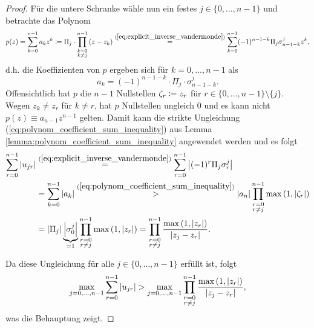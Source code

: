 \begin{proof}
    \noindent Für die untere Schranke wähle nun ein festes
    $j \in \{0, \dots, n-1\}$ und betrachte das Polynom
    \[
        p(z) = \sum_{k=0}^{n-1} a_k z^k
        \coloneqq \Pi_j \cdot \prod_{\substack{k=0\\ k \neq j}}^{n-1} \left( z - z_k \right)
        \overset{(\ref{eq:explicit_inverse_vandermonde})}{=} \sum_{k=0}^{n-1} (-1)^{n-1-k} \Pi_j \sigma_{n-1-k}^j z^k,
    \]
    d.h. die Koeffizienten von $p$ ergeben sich für $k = 0, \dots, n-1$ als
    \[
        a_k = (-1)^{n-1-k} \cdot \Pi_j \cdot \sigma_{n-1-k}^j.
    \]
    Offensichtlich hat $p$ die $n-1$ Nullstellen
    $\zeta_r \coloneqq z_r$ für $r \in \{0,\dots,n-1\} \setminus \{j\}$.
    Wegen $z_k \neq z_r$ für $k \neq r$, hat $p$ Nullstellen ungleich $0$ und
    es kann nicht $p(z) \equiv a_{n-1} z^{n-1}$ gelten.
    Damit kann die strikte Ungleichung
    (\ref{eq:polynom_coefficient_sum_inequality}) aus Lemma
    \ref{lemma:polynom_coefficient_sum_inequality} angewendet werden und es
    folgt
    \[
        \begin{split}
            \sum_{r=0}^{n-1} \left\lvert u_{jr} \right\rvert
            &\overset{(\ref{eq:explicit_inverse_vandermonde})}{=}
                \sum_{r=0}^{n-1} \left\lvert (-1)^r \Pi_j \sigma_r^j \right\rvert\\
            &= \sum_{k=0}^{n-1} \left\lvert a_k \right\rvert
            \overset{(\ref{eq:polynom_coefficient_sum_inequality})}{>}
                \left\lvert a_{n} \right\rvert \prod_{\substack{r=0\\ r \neq j}}^{n-1} \max \left(1, \left\lvert \zeta_r \right\rvert \right)\\
            &= \left\lvert \Pi_j \right\rvert \underbrace{\left\lvert \sigma_0^j \right\rvert}_{=1} \prod_{\substack{r=0\\ r \neq j}}^{n-1} \max \left(1, \left\lvert z_r \right\rvert \right)
            = \prod_{\substack{r=0\\ r \neq j}}^{n-1} \frac{\max \left(1, \left\lvert z_r \right\rvert \right)}{\left\lvert z_j - z_r \right\rvert}.
        \end{split}
    \]

    \noindent Da diese Ungleichung für alle $j \in \{0, \dots, n-1\}$ erfüllt ist, folgt
    \[
        \max_{j = 0, \dots, n-1} \sum_{r=0}^{n-1} \left\lvert u_{jr} \right\rvert
        > \max_{j = 0, \dots, n-1} \prod_{\substack{r=0\\ r \neq j}}^{n-1} \frac{\max \left(1, \left\lvert z_r \right\rvert \right)}{\left\lvert z_j - z_r \right\rvert},
    \]
    was die Behauptung zeigt.
\end{proof}

